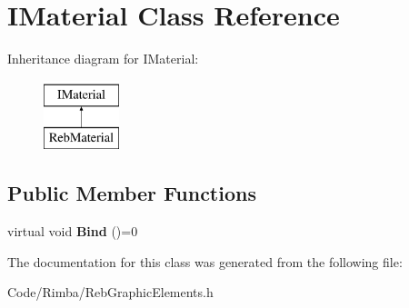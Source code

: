 \hypertarget{class_i_material}{}\section{I\+Material Class Reference}
\label{class_i_material}
Inheritance diagram for I\+Material\+:\begin{figure}[H]
\begin{center}
\leavevmode
\includegraphics[height=2.000000cm]{class_i_material}
\end{center}
\end{figure}
\subsection*{Public Member Functions}
\begin{DoxyCompactItemize}
\item 
virtual void {\bfseries Bind} ()=0\hypertarget{class_i_material_a0bf1f5681d82e5e8fb0a393cdff4fab5}{}\label{class_i_material_a0bf1f5681d82e5e8fb0a393cdff4fab5}

\end{DoxyCompactItemize}


The documentation for this class was generated from the following file\+:\begin{DoxyCompactItemize}
\item 
Code/\+Rimba/Reb\+Graphic\+Elements.\+h\end{DoxyCompactItemize}
